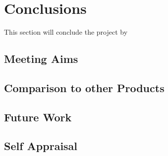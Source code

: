 \section{Conclusions}\label{sec:conclusion}
	This section will conclude the project by 
	\subsection{Meeting Aims}
	\subsection{Comparison to other Products}
	\subsection{Future Work}\label{sec:conclusion_future_work}
	\subsection{Self Appraisal}
